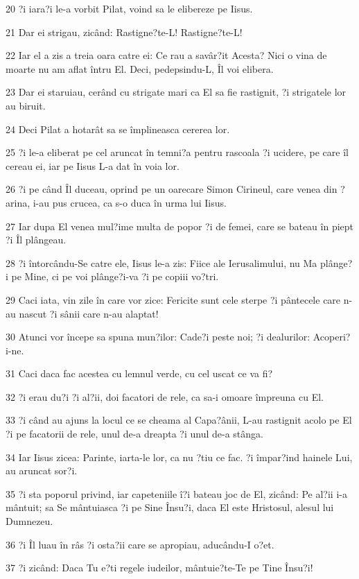 \par 20 ?i iara?i le-a vorbit Pilat, voind sa le elibereze pe Iisus.
\par 21 Dar ei strigau, zicând: Rastigne?te-L! Rastigne?te-L!
\par 22 Iar el a zis a treia oara catre ei: Ce rau a savâr?it Acesta? Nici o vina de moarte nu am aflat întru El. Deci, pedepsindu-L, Îl voi elibera.
\par 23 Dar ei staruiau, cerând cu strigate mari ca El sa fie rastignit, ?i strigatele lor au biruit.
\par 24 Deci Pilat a hotarât sa se împlineasca cererea lor.
\par 25 ?i le-a eliberat pe cel aruncat în temni?a pentru rascoala ?i ucidere, pe care îl cereau ei, iar pe Iisus L-a dat în voia lor.
\par 26 ?i pe când Îl duceau, oprind pe un oarecare Simon Cirineul, care venea din ?arina, i-au pus crucea, ca s-o duca în urma lui Iisus.
\par 27 Iar dupa El venea mul?ime multa de popor ?i de femei, care se bateau în piept ?i Îl plângeau.
\par 28 ?i întorcându-Se catre ele, Iisus le-a zis: Fiice ale Ierusalimului, nu Ma plânge?i pe Mine, ci pe voi plânge?i-va ?i pe copiii vo?tri.
\par 29 Caci iata, vin zile în care vor zice: Fericite sunt cele sterpe ?i pântecele care n-au nascut ?i sânii care n-au alaptat!
\par 30 Atunci vor începe sa spuna mun?ilor: Cade?i peste noi; ?i dealurilor: Acoperi?i-ne.
\par 31 Caci daca fac acestea cu lemnul verde, cu cel uscat ce va fi?
\par 32 ?i erau du?i ?i al?ii, doi facatori de rele, ca sa-i omoare împreuna cu El.
\par 33 ?i când au ajuns la locul ce se cheama al Capa?ânii, L-au rastignit acolo pe El ?i pe facatorii de rele, unul de-a dreapta ?i unul de-a stânga.
\par 34 Iar Iisus zicea: Parinte, iarta-le lor, ca nu ?tiu ce fac. ?i împar?ind hainele Lui, au aruncat sor?i.
\par 35 ?i sta poporul privind, iar capeteniile î?i bateau joc de El, zicând: Pe al?ii i-a mântuit; sa Se mântuiasca ?i pe Sine Însu?i, daca El este Hristosul, alesul lui Dumnezeu.
\par 36 ?i Îl luau în râs ?i osta?ii care se apropiau, aducându-I o?et.
\par 37 ?i zicând: Daca Tu e?ti regele iudeilor, mântuie?te-Te pe Tine Însu?i!
